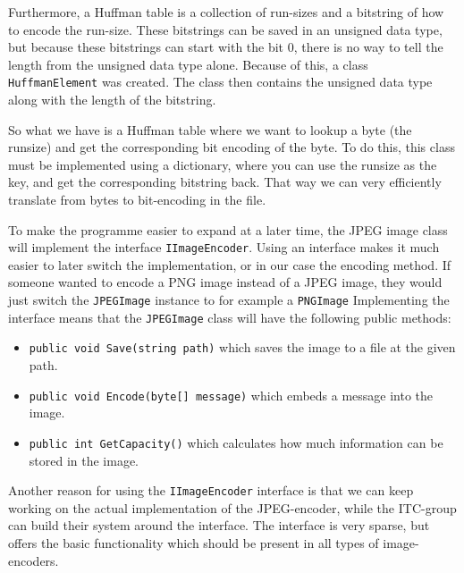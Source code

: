 Furthermore, a Huffman table is a collection of run-sizes and a bitstring of how to encode the run-size.
These bitstrings can be saved in an unsigned data type, but because these bitstrings can start with the bit 0, there is no way to tell the length from the unsigned data type alone.
Because of this, a class \lstinline|HuffmanElement| was created.
The class then contains the unsigned data type along with the length of the bitstring.

So what we have is a Huffman table where we want to lookup a byte (the runsize) and get the corresponding bit encoding of the byte. To do this, this class must be implemented using a dictionary, where you can use the runsize as the key, and get the corresponding bitstring back. That way we can very efficiently translate from bytes to bit-encoding in the file. 


To make the programme easier to expand at a later time, the JPEG image class will implement the interface \lstinline|IImageEncoder|. Using an interface makes it much easier to later switch the implementation, or in our case the encoding method. If someone wanted to encode a PNG image instead of a JPEG image, they would just switch the \lstinline|JPEGImage| instance to for example a \lstinline|PNGImage|
Implementing the interface means that the \lstinline|JPEGImage| class will have the following public methods:

\begin{itemize}
	\item \lstinline|public void Save(string path)| which saves the image to a file at the given path.
	\item \lstinline|public void Encode(byte[] message)| which embeds a message into the image.
	\item \lstinline|public int GetCapacity()| which calculates how much information can be stored in the image.
\end{itemize}

Another reason for using the \lstinline|IImageEncoder| interface is that we can keep working on the actual implementation of the JPEG-encoder, while the ITC-group can build their system around the interface. The interface is very sparse, but offers the basic functionality which should be present in all types of image-encoders.